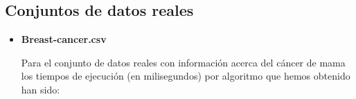 \documentclass[oneside,openright,titlepage,numbers=noenddot,openany,headinclude,footinclude=true,
cleardoublepage=empty,abstractoff,BCOR=5mm,paper=a4,fontsize=12pt,main=spanish]{scrreprt}
\begin{document}
\subsection{Conjuntos de datos reales}
\begin{itemize}
\item \textbf{Breast-cancer.csv}

Para el conjunto de datos reales con información acerca del cáncer de mama los tiempos de ejecución (en milisegundos) por algoritmo que hemos obtenido han sido:

\begin{table}[H]
    \centering
    \caption{Tabla de tiempos de ejecución en ms para el conjunto de datos de cáncer de pulmón.}
\end{table}


\end{itemize}
\end{document}
